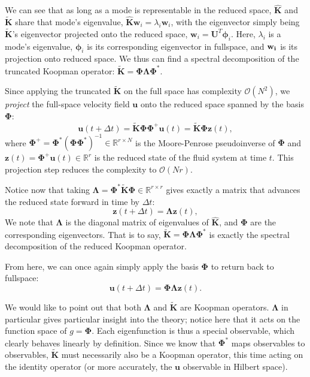 We can see that as long as a mode is representable in the reduced space, $\hat{\bm{K}}$ and $\tilde{\bm{K}}$ share that mode's eigenvalue, $\hat{\bm{K}}\bm w_i = \lambda_i \bm w_i$, with the eigenvector simply being $\tilde{\bm{K}}$'s eigenvector projected onto the reduced space, $\bm w_i = \bm U^T \bm \phi_i$. 
Here, $\lambda_i$ is a mode's eigenvalue, $\bm \phi_i$ is its corresponding eigenvector in fullspace, and $\bf w_i$ is its projection onto reduced space. 
We thus can find a spectral decomposition of the truncated Koopman operator: $\tilde{\bm{K}} = \bm{\Phi}\bm{\Lambda}\bm{\Phi}^*$. 

Since applying the truncated \koopman{} $\tilde{\bm{K}}$ on the full space has complexity $\mathcal{O}(N^2)$, we \textit{project} the full-space velocity field $\bm{u}$ onto the reduced space spanned by the basis $\bm{\Phi}$:
\begin{equation}
    \label{eqn:projection}
    \bm{u}(t + \Delta t) = \tilde{\bm{K}} \bm{\Phi} \bm{\Phi}^+ \bm{u}(t) = \tilde{\bm{K}} \bm{\Phi} \bm{z}(t),
\end{equation}
where $\bm{\Phi}^+ = \bm{\Phi}^* (\bm{\Phi} \bm{\Phi}^*)^{-1} \in \mathbb{R}^{r \times N}$ is the Moore-Penrose pseudoinverse of $\bm{\Phi}$ and $\bm{z}(t) = \bm{\Phi}^+ \bm{u}(t) \in \mathbb{R}^r$ is the reduced state of the fluid system at time $t$. This projection step reduces the complexity to $\mathcal{O}(Nr)$.

Notice now that taking $\bm{\Lambda} = \bm{\Phi}^*\tilde{\bm{K}}\bm{\Phi}\in \mathbb{R}^{r\times r}$ gives exactly a matrix that advances the reduced state forward in time by $\Delta{}t$:
\begin{equation}
    \label{eqn:reduced_koopman_simulation}
    \bm{z}(t + \Delta t) = \bm{\Lambda} \bm{z}(t),
\end{equation}
We note that $\bm{\Lambda}$ is the diagonal matrix of eigenvalues of $\hat{\bm{K}}$, and $\bm{\Phi}$ are the corresponding eigenvectors. That is to say, $\tilde{\bm{K}}=\bm{\Phi}\bm{\Lambda}\bm{\Phi}^*$ is exactly the spectral decomposition of the reduced Koopman operator.

From here, we can once again simply apply the basis $\bm{\Phi}$ to return back to fullspace:
\begin{equation}
    \label{eqn:reduced_koopman_projection}
    \bm{u}(t + \Delta t) = \bm{\Phi} \bm{\Lambda} \bm{z}(t).
\end{equation}

We would like to point out that both $\bm{\Lambda}$ and $\tilde{\bm{K}}$ are Koopman operators. $\bm{\Lambda}$ in particular gives particular insight into the theory; notice here that it acts on the function space of $g=\bm{\Phi}$. Each eigenfunction is thus a special observable, which clearly behaves linearly by definition. Since we know that $\bm{\Phi}^*$ maps observables to observables, $\tilde{\bm{K}}$ must necessarily also be a Koopman operator, this time acting on the identity operator (or more accurately, the $\bm{u}$ observable in Hilbert space).

